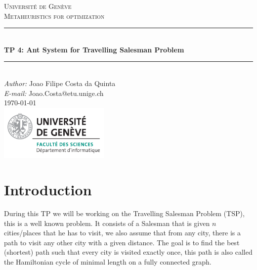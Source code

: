 \documentclass[a4paper]{article}
\makeatletter
\newcommand\TPid{4}
\newcommand\TPname{Ant System for Travelling Salesman Problem}
\newcommand\Firstname{Joao Filipe}
\newcommand\Familyname{Costa da Quinta}
\newcommand\Email{Joao.Costa@etu.unige.ch}
\makeatother
\begin{document}
\begin{titlepage}

\newcommand{\HRule}{\rule{\linewidth}{0.5mm}} 							%

\center 
 
\textsc{\LARGE Université de Genève}\\[1cm]

\textsc{\Large Metaheuristics for optimization}\\[0.2cm]									%
\HRule \\[0.8cm]
{ \huge \bfseries TP \TPid : \TPname}\\[0.7cm]								%
\HRule \\[2cm]
\large
\emph{Author:} \Firstname \; \Familyname\\[0.5cm]		
\emph{E-mail:} {\color{blue}\Email}\\[7cm]		
{\large \today}\\[2cm]
\includegraphics[width=0.4\textwidth]{images/unige_csd.png}\\[1cm] 	%
\vfill 
\end{titlepage}


\newpage
\section{Introduction}
During this TP we will be working on the Travelling Salesman Problem (TSP), this is a well known problem. It consists of a Salesman that is given $n$ cities/places that he has to visit, we also assume that from any city, there is a path to visit any other city with a given distance. The goal is to find the best (shortest) path such that every city is visited exactly once, this path is also called the Hamiltonian cycle of minimal length on a fully connected graph.
\end{document}
